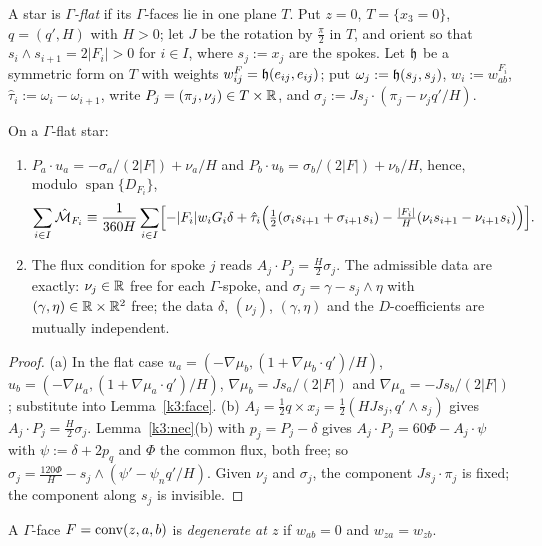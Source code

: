 A star is \emph{$\Gamma$-flat} if its $\Gamma$-faces lie in one plane $T$. Put $z=0$, $T=\{x_3=0\}$, $q=(q',H)$ with $H>0$; let $J$ be the rotation by $\frac\pi2$ in $T$, and orient so that $s_i\wedge s_{i+1}=2|F_i|>0$ for $i\in I$, where $s_j:=x_j$ are the spokes. Let $\mathfrak h$ be a symmetric form on $T$ with weights $w^F_{ij}=\mathfrak h(e_{ij},e_{ij})$; put $\omega_j:=\mathfrak h(s_j,s_j)$, $w_i:=w^{F_i}_{ab}$, $\hat\tau_i:=\omega_i-\omega_{i+1}$, write $P_j=(\pi_j,\nu_j)\in T\times\mathbb R$, and $\sigma_j:=Js_j\cdot(\pi_j-\nu_jq'/H)$.

\begin{lemma}\label{k3:flat}
On a $\Gamma$-flat star:
\begin{enumerate}[label=(\alph*)]
\item $P_a\cdot u_a=-\sigma_a/(2|F|)+\nu_a/H$ and $P_b\cdot u_b=\sigma_b/(2|F|)+\nu_b/H$, hence, modulo $\operatorname{span}\{D_{F_i}\}$,
\[
\sum_{i\in I}\hat{\mathcal M}_{F_i}\equiv\frac1{360H}\sum_{i\in I}\Bigl[-|F_i|w_iG_i\delta+\hat\tau_i\Bigl(\tfrac12(\sigma_is_{i+1}+\sigma_{i+1}s_i)-\tfrac{|F_i|}H(\nu_is_{i+1}-\nu_{i+1}s_i)\Bigr)\Bigr].
\]
\item The flux condition for spoke $j$ reads $A_j\cdot P_j=\frac H2\sigma_j$. The admissible data are exactly: $\nu_j\in\mathbb R$ free for each $\Gamma$-spoke, and $\sigma_j=\gamma-s_j\wedge\eta$ with $(\gamma,\eta)\in\mathbb R\times\mathbb R^2$ free; the data $\delta$, $(\nu_j)$, $(\gamma,\eta)$ and the $D$-coefficients are mutually independent.
\end{enumerate}
\end{lemma}

\begin{proof}
(a) In the flat case $u_a=(-\nabla\mu_b,(1+\nabla\mu_b\cdot q')/H)$, $u_b=(-\nabla\mu_a,(1+\nabla\mu_a\cdot q')/H)$, $\nabla\mu_b=Js_a/(2|F|)$ and $\nabla\mu_a=-Js_b/(2|F|)$; substitute into Lemma~\ref{k3:face}. (b) $A_j=\frac12q\times x_j=\frac12(HJs_j,q'\wedge s_j)$ gives $A_j\cdot P_j=\frac H2\sigma_j$. Lemma~\ref{k3:nec}(b) with $p_j=P_j-\delta$ gives $A_j\cdot P_j=60\Phi-A_j\cdot\psi$ with $\psi:=\delta+2p_q$ and $\Phi$ the common flux, both free; so $\sigma_j=\frac{120\Phi}H-s_j\wedge(\psi'-\psi_nq'/H)$. Given $\nu_j$ and $\sigma_j$, the component $Js_j\cdot\pi_j$ is fixed; the component along $s_j$ is invisible.
\end{proof}

\begin{definition}
A $\Gamma$-face $F=\operatorname{conv}(z,a,b)$ is \emph{degenerate at $z$} if $w_{ab}=0$ and $w_{za}=w_{zb}$.
\end{definition}

